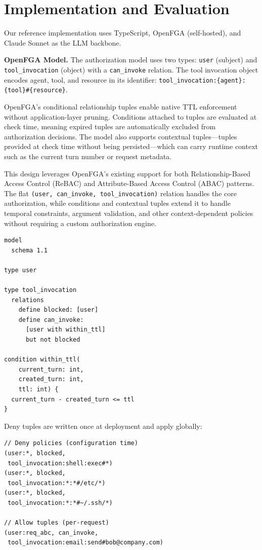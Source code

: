 \documentclass[11pt]{article}
\begin{document}
\section{Implementation and Evaluation}

Our reference implementation uses TypeScript, OpenFGA (self-hosted), and Claude Sonnet as the LLM backbone.

\textbf{OpenFGA Model.} The authorization model uses two types: \texttt{user} (subject) and \texttt{tool\_invocation} (object) with a \texttt{can\_invoke} relation. The tool invocation object encodes agent, tool, and resource in its identifier: \texttt{tool\_invocation:\{agent\}:\{tool\}\#\{resource\}}.

OpenFGA's conditional relationship tuples enable native TTL enforcement without application-layer pruning. Conditions attached to tuples are evaluated at check time, meaning expired tuples are automatically excluded from authorization decisions. The model also supports contextual tuples---tuples provided at check time without being persisted---which can carry runtime context such as the current turn number or request metadata.

This design leverages OpenFGA's existing support for both Relationship-Based Access Control (ReBAC) and Attribute-Based Access Control (ABAC) patterns. The flat \texttt{(user, can\_invoke, tool\_invocation)} relation handles the core authorization, while conditions and contextual tuples extend it to handle temporal constraints, argument validation, and other context-dependent policies without requiring a custom authorization engine.

\begin{lstlisting}[language={}]
model
  schema 1.1

type user

type tool_invocation
  relations
    define blocked: [user]
    define can_invoke:
      [user with within_ttl]
      but not blocked

condition within_ttl(
    current_turn: int,
    created_turn: int,
    ttl: int) {
  current_turn - created_turn <= ttl
}
\end{lstlisting}

Deny tuples are written once at deployment and apply globally:

\begin{lstlisting}[language={}]
// Deny policies (configuration time)
(user:*, blocked,
 tool_invocation:shell:exec#*)
(user:*, blocked,
 tool_invocation:*:*#/etc/*)
(user:*, blocked,
 tool_invocation:*:*#~/.ssh/*)

// Allow tuples (per-request)
(user:req_abc, can_invoke,
 tool_invocation:email:send#bob@company.com)
\end{lstlisting}
\end{document}
